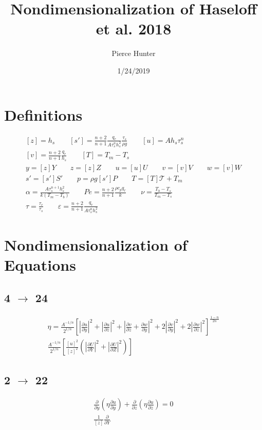 \documentclass[10pt, letterpaper, twoside]{article}
\title{Nondimensionalization of Haseloff et al. 2018}
\author{Pierce Hunter}
\date{1/24/2019}
\newcommand{\pd}[2]{\frac{\partial#1}{\partial#2}}
\begin{document}
	\maketitle
	\section{Definitions}
	\begin{gather*}
		\left[z\right] = h_s \qquad
		\left[s'\right] = \frac{n+2}{n+1}\frac{q_r}{A\tau_s^nh_s^2}\frac{\tau_s}{\rho g} \qquad
		\left[u\right] = Ah_s\tau_s^n\\
		\left[v\right] = \frac{n+2}{n+1}\frac{q_r}{h_s} \qquad
		\left[T\right] = T_m-T_s\\
		y = \left[z\right]Y \qquad
		z = \left[z\right]Z \qquad
		u = \left[u\right]U \qquad
		v = \left[v\right]V \qquad
		w = \left[v\right]W\\
		s' = \left[s'\right]S' \qquad
		p = \rho g \left[s'\right]P \qquad
		T = \left[T\right]\mathcal{T} + T_m\\
		\alpha = \frac{A\tau_s^{n+1}h_s^2}{k\left(T_m-T_b\right)} \qquad
		Pe = \frac{n+2}{n+1}\frac{\rho c_pq_r}{k} \qquad
		\nu = \frac{T_b-T_s}{T_m-T_s}\\
		\tau = \frac{\tau_c}{\tau_s} \qquad
		\varepsilon = \frac{n+2}{n+1}\frac{q_r}{A\tau_s^nh_s^2}
	\end{gather*}
	
	\section{Nondimensionalization of Equations}
	\subsection{4 $ \rightarrow $ 24}
	\begin{gather*}
		\eta = \frac{A^{-1/n}}{2^{1/n}}\left[\left|\pd{u}{y}\right|^2 + \left|\pd{u}{z}\right|^2 + \left|\pd{v}{z} + \pd{w}{y}\right|^2 + 2\left|\pd{v}{y}\right|^2 + 2\left|\pd{w}{z}\right|^2\right]^{\frac{1-n}{2n}}\\
		\frac{A^{-1/n}}{2^{1/n}}\left[\frac{\left[u\right]^2}{\left[z\right]^2}\left(\left|\pd{U}{Y}\right|^2 + \left|\pd{U}{Z}\right|^2\right)\right]
	\end{gather*}
	\subsection{2 $ \rightarrow $ 22}
	\begin{gather*}
		\pd{}{y}\left(\eta\pd{u}{y}\right) + \pd{}{z}\left(\eta\pd{u}{z}\right) = 0\\
		\frac{1}{\left[z\right]}\pd{}{Y}
	\end{gather*}
	
\end{document}
